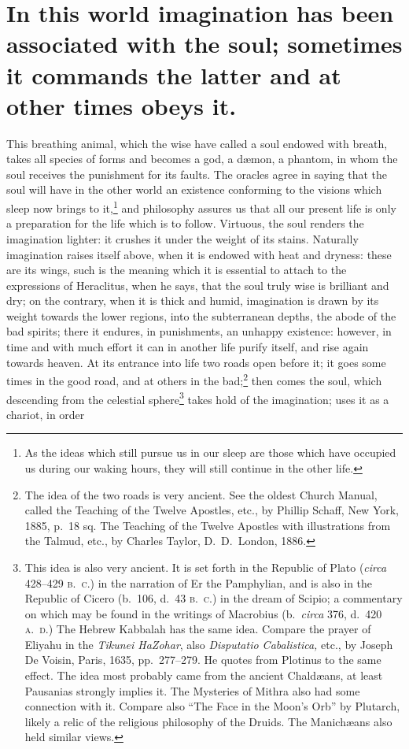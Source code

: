 \documentclass[12pt]{article}
\begin{document}
\section{In this world imagination has been associated with the soul; sometimes
it commands the latter and at other times obeys it.}

This breathing animal, which the wise have called a soul endowed with breath,
takes all species of forms and becomes a god, a d{\ae}mon, a phantom, in whom
the soul receives the punishment for its faults. The oracles agree in saying
that the soul will have in the other world an existence conforming to the
visions which sleep now brings to it,\footnote{As the ideas which still pursue
us in our sleep are those which have occupied us during our waking hours, they
will still continue in the other life.} and philosophy assures us that all our
present life is only a preparation for the life which is to follow. Virtuous,
the soul renders the imagination lighter: it crushes it under the weight of its
stains. Naturally imagination raises itself above, when it is endowed with
heat and dryness: these are its wings, such is the meaning which it is
essential to attach to the expressions of Heraclitus, when he says, that the
soul truly wise is brilliant and dry; on the contrary, when it is thick and
humid, imagination is drawn by its weight towards the lower regions, into the
subterranean depths, the abode of the bad spirits; there it endures, in
punishments, an unhappy existence: however, in time and with much effort it can
in another life purify itself, and rise again towards heaven. At its entrance
into life two roads open before it; it goes some times in the good road, and at
others in the bad;\footnote{The idea of the two roads is very ancient. See the
oldest Church Manual, called the Teaching of the Twelve Apostles, etc., by
Phillip Schaff, New York, 1885, p.~18 sq. The Teaching of the Twelve Apostles
with illustrations from the Talmud, etc., by Charles Taylor, D.~D.~London,
1886.} then comes the soul, which descending from the celestial
sphere\footnote{This idea is also very ancient. It is set forth in the Republic
of Plato (\textit{circa} 428--429 \textsc{b.~c.}) in the narration of Er the
Pamphylian, and is also in the Republic of Cicero (b.~106, d.~43
\textsc{b.~c.}) in the dream of Scipio; a commentary on which may be found in
the writings of Macrobius (b.~\textit{circa} 376, d.~420 \textsc{a.~d.}) The
Hebrew Kabbalah has the same idea. Compare the prayer of Eliyahu in the
\textit{Tikunei HaZohar}, also \textit{Disputatio Cabalistica,} etc., by Joseph
De Voisin, Paris, 1635, pp.~277--279. He quotes from Plotinus to the same
effect. The idea most probably came from the ancient Chald{\ae}ans, at least
Pausanias strongly implies it. The Mysteries of Mithra also had some connection
with it. Compare also ``The Face in the Moon's Orb'' by Plutarch, likely a
relic of the religious philosophy of the Druids. The Manich{\ae}ans also held
similar views.} takes hold of the imagination; uses it as a chariot, in order
\end{document}
